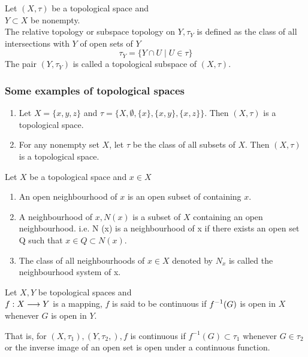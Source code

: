 \begin{defn}[Subspace]
    Let $(X, \tau)$ be a topological space and\\
     $Y \subset X$ be nonempty.\\
    The relative topology or subspace topology on $Y, \tau_Y$ is defined as the class of all intersections with $Y$ of open sets of $Y$
    \[
        \tau_Y = \{Y \cap U  \mid U \in \tau\}
    \]
    The pair $(Y, \tau_Y)$ is called a topological subspace of $(X, \tau)$.
\end{defn}

\subsubsection*{Some examples of topological spaces}
\begin{enumerate}
    \item Let $X = \{x,y,z\}$ and $\tau = \{X, \emptyset, \{x\}, \{x,y\}, \{x,z\}\}$. Then $(X, \tau)$ is a topological space.
    \item For any nonempty set $X$, let $\tau$ be the class of all  subsets of $X$. Then $(X, \tau)$ is a topological space.
\end{enumerate}

\begin{defn}
    Let $X$ be a topological space and $x \in X$ 
    \begin{enumerate}
        \item An open neighbourhood of $x$ is an open subset of containing $x$.
        \item A neighbourhood of $x, N(x)$ is a subset of $X$ containing an open neighbourhood. i.e. N (x) is a neighbourhood of x if there exists an open set Q such that $x \in Q \subset N (x)$.
        \item The class of all neighbourhoods of $x \in X$ denoted by $N_x$ is called the neighbourhood system of x.
    \end{enumerate}
\end{defn}

\begin{defn}
    Let $X,Y$ be topological spaces and \\
    $\displaystyle f: X \longrightarrow Y$ is a mapping, $f$ is said to be continuous if $\displaystyle f^{-1}(G)$ is open in $X$ whenever $G$ is open in $Y$.

    That is, for $(X, \tau_1),(Y, \tau_2,), f$ is continuous if $f^{-1} (G) \subset \tau_1$ whenever $G \in \tau_2$ or the inverse image of an open set is open under a continuous function.
\end{defn}

